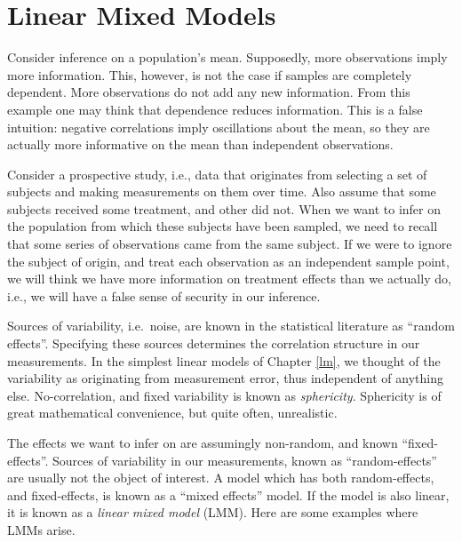 \documentclass[]{book}
\theoremstyle{definition}
\theoremstyle{definition}
\theoremstyle{definition}
\theoremstyle{remark}
\let\BeginKnitrBlock\begin \let\EndKnitrBlock\end
\begin{document}
\hypertarget{lme}{%
\chapter{Linear Mixed Models}\label{lme}}

\BeginKnitrBlock{example}[Dependent Samples on the Mean]
\protect\hypertarget{exm:dependence}{}{\label{exm:dependence} {} }Consider inference on a population's mean.
Supposedly, more observations imply more information. This, however, is not the case if samples are completely dependent. More observations do not add any new information.
From this example one may think that dependence reduces information. This is a false intuition: negative correlations imply oscillations about the mean, so they are actually more informative on the mean than independent observations.
\EndKnitrBlock{example}

\BeginKnitrBlock{example}[Repeated Measures]
\protect\hypertarget{exm:repeated-measures}{}{\label{exm:repeated-measures} {} }Consider a prospective study, i.e., data that originates from selecting a set of subjects and making measurements on them over time.
Also assume that some subjects received some treatment, and other did not.
When we want to infer on the population from which these subjects have been sampled, we need to recall that some series of observations came from the same subject.
If we were to ignore the subject of origin, and treat each observation as an independent sample point, we will think we have more information on treatment effects than we actually do, i.e., we will have a false sense of security in our inference.
\EndKnitrBlock{example}

Sources of variability, i.e.~noise, are known in the statistical literature as ``random effects''.
Specifying these sources determines the correlation structure in our measurements.
In the simplest linear models of Chapter \ref{lm}, we thought of the variability as originating from measurement error, thus independent of anything else.
No-correlation, and fixed variability is known as \emph{sphericity}.
Sphericity is of great mathematical convenience, but quite often, unrealistic.

The effects we want to infer on are assumingly non-random, and known ``fixed-effects''.
Sources of variability in our measurements, known as ``random-effects'' are usually not the object of interest.
A model which has both random-effects, and fixed-effects, is known as a ``mixed effects'' model.
If the model is also linear, it is known as a \emph{linear mixed model} (LMM).
Here are some examples where LMMs arise.
\end{document}
